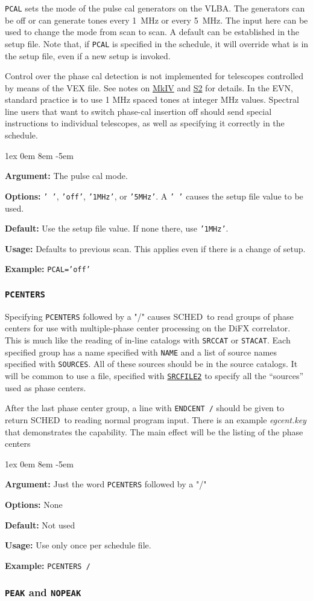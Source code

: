 \documentclass{report}
\newcommand{\schedb}{{\sc SCHED~}}
\newcommand{\rcwbox}[5]{
  \begin{list}{}{\parsep 1ex  \itemsep 0em
                 \leftmargin 8em  \itemindent -5em }
    \item {\bf Argument:} #1
    \item {\bf Options:}  #2
    \item {\bf Default:}  #3
    \item {\bf Usage:}    #4
    \item {\bf Example:}  #5
  \end{list}
}
\begin{document}
{\tt PCAL} sets the mode of the pulse cal generators on the VLBA. The
generators can be off or can generate tones every 1~MHz or every
5~MHz. The input here can be used to change the mode from scan to
scan. A default can be established in the setup file.  Note that, if
{\tt PCAL} is specified in the schedule, it will override what is
in the setup file, even if a new setup is invoked.

Control over the phase cal detection is not implemented for telescopes
controlled by means of the VEX file. See notes on 
{\hyperref[SSEC:MKIV]{MkIV}} and 
{\hyperref[SSEC:S2]{S2}} for details. In the EVN,
standard practice is to use 1 MHz spaced tones at integer MHz
values. Spectral line users that want to switch phase-cal insertion
off should send special instructions to individual telescopes, as well
as specifying it correctly in the schedule.

\rcwbox
{The pulse cal mode.}
{{\tt ' '}, {\tt 'off'}, {\tt '1MHz'}, or {\tt '5MHz'}. A {\tt ' '}
causes the setup file value to be used.}
{Use the setup file value. If none there, use {\tt '1MHz'}.}
{Defaults to previous scan.  This applies even if there is a change
of setup.}
{{\tt PCAL='off'}}


\subsubsection{\label{MP:PCENTERS}{\tt PCENTERS}}

Specifying {\tt PCENTERS} followed by a "/" causes \schedb to read
groups of phase centers for use with multiple-phase center processing
on the DiFX correlator.  This is much like the reading of in-line
catalogs with {\tt SRCCAT} or {\tt STACAT}.  Each specified group has
a name specified with {\tt NAME} and a list of source names specified
with {\tt SOURCES}.  All of these sources should be in the source
catalogs.  It will be common to use a file, specified with
{\hyperref[MP:SRCFILE2]{{\tt SRCFILE2}}} to specify all the ``sources''
used as phase centers.

After the last phase center group, a line with
{\tt ENDCENT /} should be given to return \schedb to reading normal
program input.  There is an example {\sl egcent.key} that demonstrates
the capability.  The main effect will be the listing of the phase
centers

\rcwbox
{Just the word {\tt PCENTERS} followed by a "/"}
{None}
{Not used}
{Use only once per schedule file.}
{{\tt PCENTERS /}}


\subsubsection{\label{MP:PEAK}{\tt PEAK} and {\tt NOPEAK}}
\end{document}
